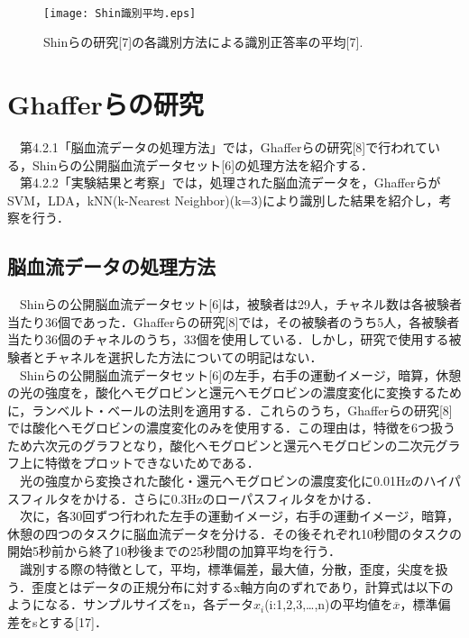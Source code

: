 \documentclass[a4j,12pt]{jreport}
\begin{document}
　\begin{figure}[t]
  \begin{center}
    \texttt{[image: Shin識別平均.eps]}
    \caption{Shinらの研究[7]の各識別方法による識別正答率の平均[7].}
    \label{fig}
  \end{center}
\end{figure}

\section{Ghafferらの研究}
　第4.2.1「脳血流データの処理方法」では，Ghafferらの研究[8]で行われている，Shinらの公開脳血流データセット[6]の処理方法を紹介する．\\
　第4.2.2「実験結果と考察」では，処理された脳血流データを，GhafferらがSVM，LDA，kNN(k-Nearest Neighbor)(k=3)により識別した結果を紹介し，考察を行う．\\

\subsection{脳血流データの処理方法}
　Shinらの公開脳血流データセット[6]は，被験者は29人，チャネル数は各被験者当たり36個であった．Ghafferらの研究[8]では，その被験者のうち5人，各被験者当たり36個のチャネルのうち，33個を使用している．しかし，研究で使用する被験者とチャネルを選択した方法についての明記はない．\\
　Shinらの公開脳血流データセット[6]の左手，右手の運動イメージ，暗算，休憩の光の強度を，酸化ヘモグロビンと還元ヘモグロビンの濃度変化に変換するために，ランベルト・ベールの法則を適用する．これらのうち，Ghafferらの研究[8]では酸化ヘモグロビンの濃度変化のみを使用する．この理由は，特徴を6つ扱うため六次元のグラフとなり，酸化ヘモグロビンと還元ヘモグロビンの二次元グラフ上に特徴をプロットできないためである．\\
　光の強度から変換された酸化・還元ヘモグロビンの濃度変化に0.01Hzのハイパスフィルタをかける．さらに0.3Hzのローパスフィルタをかける．\\
　次に，各30回ずつ行われた左手の運動イメージ，右手の運動イメージ，暗算，休憩の四つのタスクに脳血流データを分ける．その後それぞれ10秒間のタスクの開始5秒前から終了10秒後までの25秒間の加算平均を行う．\\
　識別する際の特徴として，平均，標準偏差，最大値，分散，歪度，尖度を扱う．歪度とはデータの正規分布に対するx軸方向のずれであり，計算式は以下のようになる．サンプルサイズをn，各データ$x_i$(i:1,2,3,…,n)の平均値を$\overline{x}$，標準偏差をsとする[17]．\\
\end{document}
